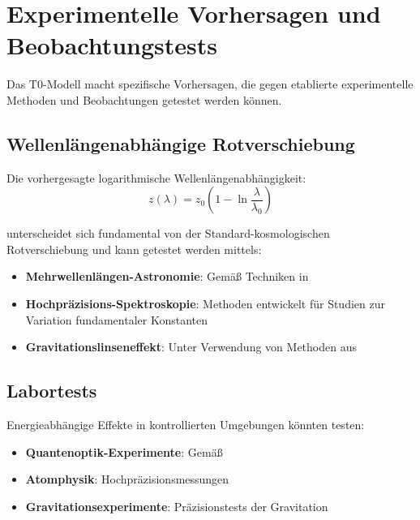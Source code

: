 \documentclass[12pt,a4paper]{article}
\begin{document}
	\section{Experimentelle Vorhersagen und Beobachtungstests}
	\label{sec:experimental_tests}
	
	Das T0-Modell macht spezifische Vorhersagen, die gegen etablierte experimentelle Methoden und Beobachtungen getestet werden können.
	
	\subsection{Wellenlängenabhängige Rotverschiebung}
	\label{subsec:wavelength_redshift}
	
	Die vorhergesagte logarithmische Wellenlängenabhängigkeit:
	\begin{equation}
		z(\lambda) = z_0\left(1 - \ln\frac{\lambda}{\lambda_0}\right)
	\end{equation}
	
	unterscheidet sich fundamental von der Standard-kosmologischen Rotverschiebung und kann getestet werden mittels:
	\begin{itemize}
		\item \textbf{Mehrwellenlängen-Astronomie}: Gemäß Techniken in \citep{longair2011,carroll2006}
		\item \textbf{Hochpräzisions-Spektroskopie}: Methoden entwickelt für Studien zur Variation fundamentaler Konstanten \citep{uzan2003,murphy2003}
		\item \textbf{Gravitationslinseneffekt}: Unter Verwendung von Methoden aus \citep{schneider1992,bartelmann2001}
	\end{itemize}
	
	\subsection{Labortests}
	\label{subsec:laboratory_tests}
	
	Energieabhängige Effekte in kontrollierten Umgebungen könnten testen:
	\begin{itemize}
		\item \textbf{Quantenoptik-Experimente}: Gemäß \citep{scully1997,knight1998}
		\item \textbf{Atomphysik}: Hochpräzisionsmessungen \citep{demtroder2008}
		\item \textbf{Gravitationsexperimente}: Präzisionstests der Gravitation \citep{will2014,adelberger2003}
	\end{itemize}
	
\end{document}
